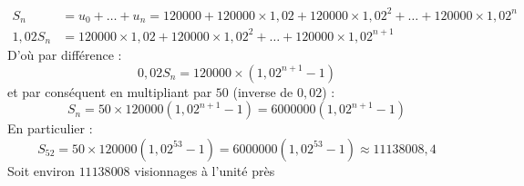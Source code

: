 \documentclass[10pt]{article}
\begin{document}
\begin{align*}
	S_n& = u_0 + \ldots + u_n = 120000 + 120000 \times 1,02 + 120000 \times 1,02^2 + \ldots + 120000 \times 1,02^n\\
	1,02 S_n& = 120000 \times 1,02 + 120000 \times 1,02^2 + \ldots + 120000 \times 1,02^{n+1}
\end{align*}
D’où par différence :
	$$	0,02 S_n = 120000 \times (1,02^{n+1} - 1) $$
	et par conséquent en multipliant par $50$ (inverse de $0,02$) :\\
	$$ S_n = 50 \times 120000 (1,02^{n+1} - 1) = 6000000 (1,02^{n+1} - 1)$$
En particulier :
	\[
	S_{52} = 50 \times 120000 (1,02^{53} - 1) = 6000000 (1,02^{53} - 1) \approx 11138008,4 	\]
	Soit environ $11 138 008$ visionnages à l’unité près
\end{document}
